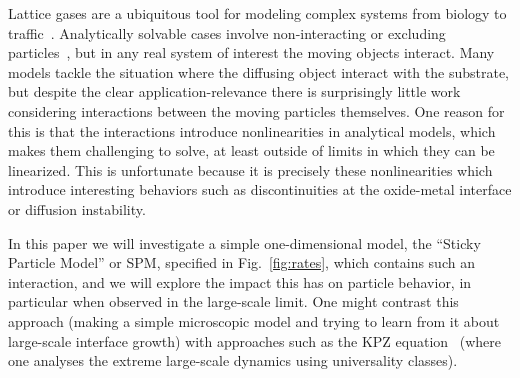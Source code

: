 \documentclass[
reprint,
 amsmath,amssymb,
 aps,
 prl,
]{revtex4-1}
\begin{document}
Lattice gases are a ubiquitous tool for modeling complex systems from biology to traffic~\cite{1742-5468-2011-07-P07007, Mobilia2007, tegner2015high, zhu2012atomic, DealGrove1965, MottCabrera1949, Buzzaccaro2007}. 
Analytically solvable cases involve non-interacting or excluding particles~\cite{ladd1988application, liggett1985interacting}, but in any real system of interest the moving objects interact. Many models tackle the situation where the diffusing
object interact with the substrate,
but despite the clear application-relevance there is surprisingly little work considering interactions between the moving particles themselves.  One reason for this is that the interactions introduce nonlinearities in analytical models, which makes them
challenging to solve, at least outside of limits in which they can be linearized. This is unfortunate because it is precisely these nonlinearities which introduce interesting behaviors such as discontinuities at the oxide-metal interface or
diffusion instability.

In this paper we will
investigate a simple one-dimensional model, the ``Sticky Particle Model'' or SPM, specified in Fig.~\ref{fig:rates}, which contains such an interaction, and we will explore the impact this has on particle behavior, in particular
when observed in the large-scale limit.
One might contrast
this approach (making a simple microscopic model and trying to learn from it about large-scale interface growth) with approaches such as the KPZ equation~\cite{PhysRevLett.56.889, PhysRevA.38.4271, Sasamoto2010} (where one analyses the extreme
large-scale dynamics using universality classes).
\end{document}
